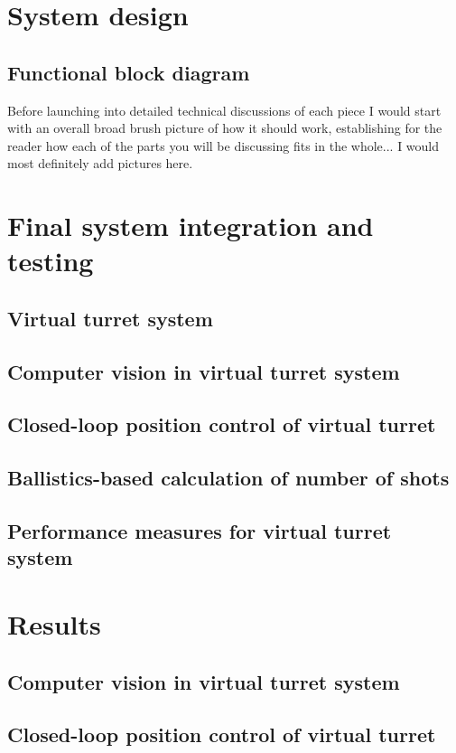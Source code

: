 \documentclass{article}
\begin{document}
\section{System design}
\subsection{Functional block diagram}
Before launching into detailed technical discussions of each piece I would start with an overall broad brush picture of how it should work, establishing for the reader how each of the parts you will be discussing fits in the whole... I would most definitely add pictures here. 







\section{Final system integration and testing}
\subsection{Virtual turret system}
\subsection{Computer vision in virtual turret system}
\subsection{Closed-loop position control of virtual turret}
\subsection{Ballistics-based calculation of number of shots}
\subsection{Performance measures for virtual turret system}

\section{Results}
\subsection{Computer vision in virtual turret system}
\subsection{Closed-loop position control of virtual turret}
\end{document}
